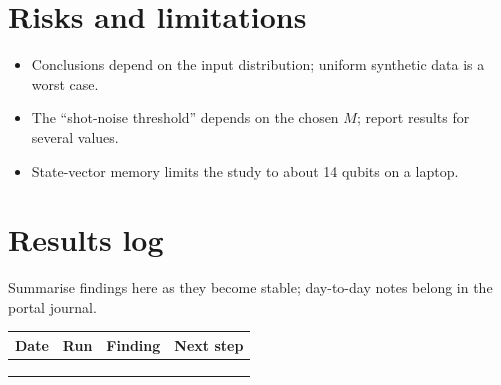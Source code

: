 \documentclass[11pt,a4paper]{article}
\begin{document}
\section{Risks and limitations}
\begin{itemize}
  \item Conclusions depend on the input distribution; uniform synthetic data is a worst case.
  \item The ``shot-noise threshold'' depends on the chosen $M$; report results for several values.
  \item State-vector memory limits the study to about 14 qubits on a laptop.
\end{itemize}

\section{Results log}
\label{sec:log}
Summarise findings here as they become stable; day-to-day notes belong in the portal journal.

\begin{table}[h]
\centering\small
\begin{tabularx}{\linewidth}{@{}l l >{\raggedright}X >{\raggedright\arraybackslash}X@{}}
\toprule
Date & Run & Finding & Next step \\
\midrule
 & & & \\
 & & & \\
 & & & \\
\bottomrule
\end{tabularx}
\end{table}



\end{document}
